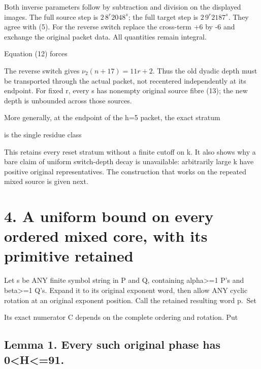 Both inverse parameters follow by subtraction and division on the
displayed images. The full source step is \(2\,8^r2048^s\); the full
target step is \(2\,9^r2187^s\). They agree with (5). For the reverse
switch replace the cross-term +6 by -6 and exchange the original packet
data. All quantities remain integral.

Equation (12) forces


The reverse switch gives \(\nu_2(n+17)=11r+2\). Thus the old dyadic
depth must be transported through the actual packet, not recentered
independently at its endpoint. For fixed r, every s has nonempty
original source fibre (13); the new depth is unbounded across those
sources.

More generally, at the endpoint of the h=5 packet, the exact stratum


is the single residue class


This retains every reset stratum without a finite cutoff on k. It also
shows why a bare claim of uniform switch-depth decay is unavailable:
arbitrarily large k have positive original representatives. The
construction that works on the repeated mixed source is given next.

\section{4. A uniform bound on every ordered mixed core, with its
primitive retained}

Let s be ANY finite symbol string in P and Q, containing
alpha\textgreater=1 P's and beta\textgreater=1 Q's. Expand it to its
original exponent word, then allow ANY cyclic rotation at an original
exponent position. Call the retained resulting word p.~Set


Its exact numerator C depends on the complete ordering and rotation. Put


\subsection{Lemma 1. Every such original phase has
0\textless H\textless=91.}

